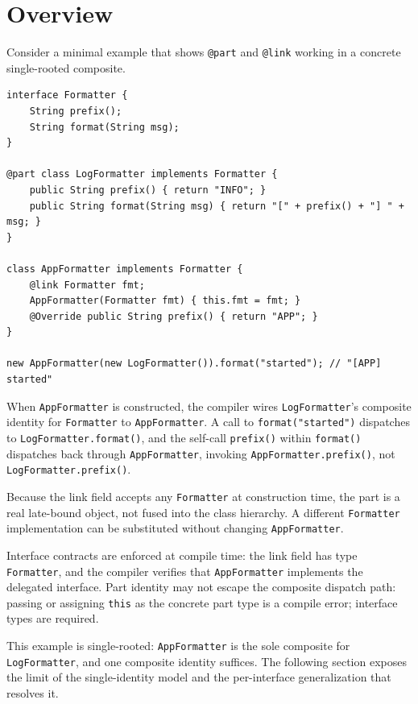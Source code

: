 \documentclass[acmsmall,nonacm]{acmart}
\theoremstyle{acmplain}
\theoremstyle{acmdefinition}
\newcommand{\code}[1]{\texttt{#1}}
\begin{document}
\section{Overview}

Consider a minimal example that shows \code{@part} and \code{@link} working in a concrete single-rooted composite.

\begin{lstlisting}
interface Formatter {
    String prefix();
    String format(String msg);
}

@part class LogFormatter implements Formatter {
    public String prefix() { return "INFO"; }
    public String format(String msg) { return "[" + prefix() + "] " + msg; }
}

class AppFormatter implements Formatter {
    @link Formatter fmt;
    AppFormatter(Formatter fmt) { this.fmt = fmt; }
    @Override public String prefix() { return "APP"; }
}

new AppFormatter(new LogFormatter()).format("started"); // "[APP] started"
\end{lstlisting}

When \code{AppFormatter} is constructed, the compiler wires
\code{LogFormatter}'s composite identity for \code{Formatter} to
\code{AppFormatter}. A call to \code{format("started")} dispatches to
\code{LogFormatter.format()}, and the self-call \code{prefix()} within
\code{format()} dispatches back through \code{AppFormatter}, invoking
\code{AppFormatter.prefix()}, not \code{LogFormatter.prefix()}.

Because the link field accepts any \code{Formatter} at construction
time, the part is a real late-bound object, not fused into the class
hierarchy. A different \code{Formatter} implementation can be substituted
without changing \code{AppFormatter}.

Interface contracts are enforced at compile time: the link field has
type \code{Formatter}, and the compiler verifies that \code{AppFormatter}
implements the delegated interface. Part identity may not escape the
composite dispatch path: passing or assigning \code{this} as the concrete
part type is a compile error; interface types are required.

This example is single-rooted: \code{AppFormatter} is the sole composite
for \code{LogFormatter}, and one composite identity suffices. The following
section exposes the limit of the single-identity model and the per-interface
generalization that resolves it.
\end{document}
